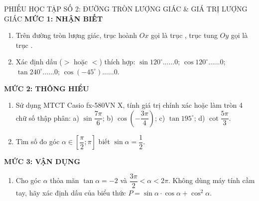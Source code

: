 \documentclass[12pt, a4paper]{article}
\begin{document}
\begin{pedabox}{PHIẾU HỌC TẬP SỐ 2: ĐƯỜNG TRÒN LƯỢNG GIÁC \& GIÁ TRỊ LƯỢNG GIÁC}
\textbf{MỨC 1: NHẬN BIẾT}
\begin{enumerate}[leftmargin=0.5cm]
    \item Trên đường tròn lượng giác, trục hoành $Ox$ gọi là trục \dotfill, trục tung $Oy$ gọi là trục \dotfill.
    \item Xác định dấu ($>$ hoặc $<$) thích hợp:
    $\sin 120^\circ \dots\dots 0$; \quad $\cos 120^\circ \dots\dots 0$; \quad $\tan 240^\circ \dots\dots 0$; \quad $\cos\left(-45^\circ\right) \dots\dots 0$.
\end{enumerate}

\textbf{MỨC 2: THÔNG HIỂU}
\begin{enumerate}[leftmargin=0.5cm]
    \item Sử dụng MTCT Casio fx-580VN X, tính giá trị chính xác hoặc làm tròn 4 chữ số thập phân:
    a) $\sin\dfrac{7\pi}{6}$; \quad b) $\cos\left(-\dfrac{3\pi}{4}\right)$; \quad c) $\tan 195^\circ$; \quad d) $\cot\dfrac{5\pi}{3}$.
    \item Tìm số đo góc $\alpha \in \left[\dfrac{\pi}{2}; \pi\right]$ biết $\sin\alpha = \dfrac{1}{2}$.
\end{enumerate}

\textbf{MỨC 3: VẬN DỤNG}
\begin{enumerate}[leftmargin=0.5cm]
    \item Cho góc $\alpha$ thỏa mãn $\tan\alpha = -2$ và $\dfrac{3\pi}{2} < \alpha < 2\pi$. Không dùng máy tính cầm tay, hãy xác định dấu của biểu thức $P = \sin\alpha \cdot \cos\alpha + \cos^2\alpha$.
\end{enumerate}
\end{pedabox}

\vspace{5pt}
\end{document}
